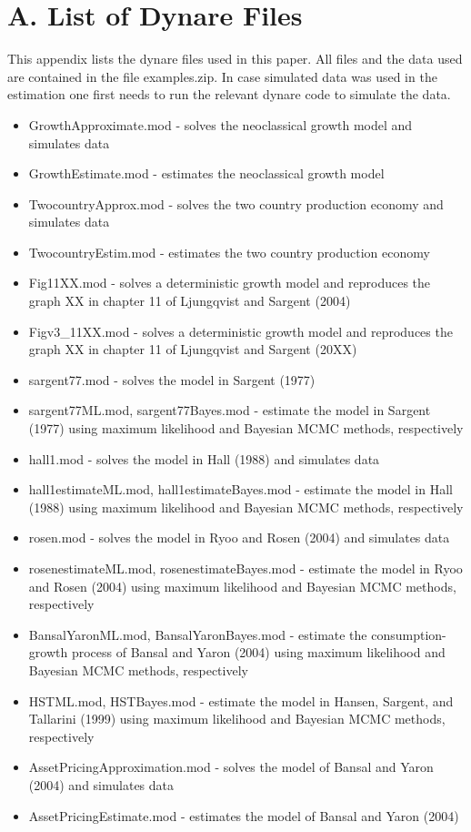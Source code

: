 \documentclass[10pt]{article}
\begin{document}
\section*{A. List of Dynare Files}
This appendix lists the dynare files used in this paper. All files and the data used are contained in the file examples.zip. In case simulated data was used in the estimation one first needs to run the relevant dynare code to simulate the data.

\begin{itemize}
  \item GrowthApproximate.mod - solves the neoclassical growth model and simulates data
  \item GrowthEstimate.mod - estimates the neoclassical growth model
  \item TwocountryApprox.mod - solves the two country production economy and simulates data
  \item TwocountryEstim.mod - estimates the two country production economy
  \item Fig11XX.mod - solves a deterministic growth model and reproduces the graph XX in chapter 11 of Ljungqvist and Sargent (2004)
  \item Figv3\_11XX.mod - solves a deterministic growth model and reproduces the graph XX in chapter 11 of Ljungqvist and Sargent (20XX)
  \item sargent77.mod - solves the model in Sargent (1977)
  \item sargent77ML.mod, sargent77Bayes.mod - estimate the model in Sargent (1977) using maximum likelihood and Bayesian MCMC methods, respectively
  \item hall1.mod - solves the model in Hall (1988) and simulates data
  \item hall1estimateML.mod, hall1estimateBayes.mod - estimate the model in Hall (1988) using maximum likelihood and Bayesian MCMC methods, respectively
  \item rosen.mod - solves the model in Ryoo and Rosen (2004) and simulates data
  \item rosenestimateML.mod, rosenestimateBayes.mod - estimate the model in Ryoo and Rosen (2004) using maximum likelihood and Bayesian MCMC methods, respectively
  \item BansalYaronML.mod, BansalYaronBayes.mod - estimate the consumption-growth process of Bansal and Yaron (2004) using maximum likelihood and Bayesian MCMC methods, respectively
  \item HSTML.mod, HSTBayes.mod - estimate the model in Hansen, Sargent, and Tallarini (1999) using maximum likelihood and Bayesian MCMC methods, respectively
  \item AssetPricingApproximation.mod - solves the model of Bansal and Yaron (2004) and simulates data
  \item AssetPricingEstimate.mod - estimates the model of Bansal and Yaron (2004)
\end{itemize}
\end{document}
